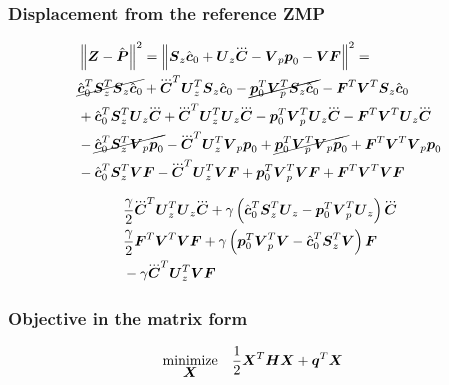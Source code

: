 \subsubsection{Displacement from the reference ZMP}
\begin{equation*}
\begin{split}
    &\norm{\ZMP - \FPh}^2 = 
    \norm{\M{S}_z \cstate_0 + \M{U}_z \cJerk  -  \M{V}_p \fp_0 - \M{V} \FD} ^ 2 = \\
%
%
    &
    \cancel{\cstate_0^T \M{S}_z^T \M{S}_z \cstate_0} 
    + \cJerk^T \M{U}_z^T \M{S}_z \cstate_0
    - \cancel{\fp_0^T \M{V}_p^T \M{S}_z \cstate_0}
    - \FD^T \M{V}^T \M{S}_z \cstate_0 \\
    &
    + \cstate_0^T \M{S}_z^T \M{U}_z \cJerk 
    + \cJerk^T \M{U}_z^T \M{U}_z \cJerk
    - \fp_0^T \M{V}_p^T \M{U}_z \cJerk
    - \FD^T \M{V}^T \M{U}_z \cJerk\\
    &
    - \cancel{\cstate_0^T \M{S}_z^T \M{V}_p \fp_0}
    - \cJerk^T \M{U}_z^T \M{V}_p \fp_0
    + \cancel{\fp_0^T \M{V}_p^T \M{V}_p \fp_0}
    + \FD^T \M{V}^T \M{V}_p \fp_0\\
    &
    - \cstate_0^T \M{S}_z^T \M{V} \FD
    - \cJerk^T \M{U}_z^T \M{V} \FD
    + \fp_0^T \M{V}_p^T \M{V} \FD
    + \FD^T \M{V}^T \M{V} \FD\\
\end{split}
\end{equation*}

\begin{equation*}
\begin{split}
    &
    \frac{\gamma}{2} \cJerk^T \M{U}_z^T \M{U}_z \cJerk
    + 
    \gamma 
    \left(
        \cstate_0^T \M{S}_z^T \M{U}_z
        - 
        \fp_0^T \M{V}_p^T \M{U}_z 
    \right)
    \cJerk\\
    &
    \frac{\gamma}{2} \FD^T \M{V}^T \M{V} \FD
    + 
    \gamma 
    \left(
        \fp_0^T \M{V}_p^T \M{V}
        - 
        \cstate_0^T \M{S}_z^T \M{V}
    \right)
    \FD\\
    &
    - \gamma \cJerk^T \M{U}_z^T \M{V} \FD
\end{split}
\end{equation*}

\subsubsection{Objective in the matrix form}
\begin{equation*}
\begin{split}
    \underset{\mbox{\boldmath $X$}}{\operatorname{minimize}}\quad    & \frac{1}{2} \mbox{\boldmath $X$}^T\mbox{\boldmath $H$}\mbox{\boldmath $X$} + \mbox{\boldmath $q$}^T \mbox{\boldmath $X$}
\end{split}
\end{equation*}

